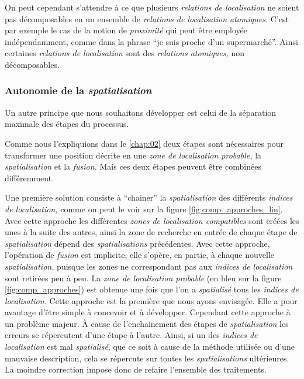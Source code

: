 On peut cependant s'attendre à ce que plusieurs \emph{relations de
  localisation} ne soient pas décomposables en un ensemble de
\emph{relations de localisation atomiques.} C'est par exemple le cas
de la notion de \emph{proximité} qui peut être employée
indépendamment, comme dans la phrase \enquote{je suis proche d'un
  supermarché}. Ainsi certaines \emph{relations de localisation} sont
des \emph{relations atomiques,} non décomposables.


\subsubsection{Autonomie de la \emph{spatialisation}}

Un autre principe que nous souhaitons développer est celui de la
séparation maximale des étapes du processus.

Comme nous l'expliquions dans le \autoref{chap:02} deux étapes sont
nécessaires pour transformer une position décrite en une \emph{zone de
  localisation probable,} la \emph{spatialisation} et la
\emph{fusion.} Mais ces deux étapes peuvent être combinées
différemment.

Une première solution consiste à \enquote{chainer} la
\emph{spatialisation} des différents \emph{indices de localisation,}
comme on peut le voir sur la figure \ref{fig:comp_approches_lin}. Avec
cette approche les différentes \emph{zones de localisation
  compatibles} sont créées les unes à la suite des autres, ainsi la
zone de recherche en entrée de chaque étape de \emph{spatialisation}
dépend des \emph{spatialisations} précédentes. Avec cette approche,
l'opération de \emph{fusion} est implicite, elle s'opère, en partie, à
chaque nouvelle \emph{spatialisation,} puisque les zones ne
correspondant pas aux \emph{indices de localisation} sont retirées peu
à peu. La \emph{zone de localisation probable} (en bleu sur la figure
\ref{fig:comp_approches}) est obtenue une fois que l'on a
\emph{spatialisé} tous les \emph{indices de localisation.} Cette
approche est la première que nous ayons envisagée. Elle a pour
avantage d'être simple à concevoir et à développer. Cependant cette
approche à un problème majeur. À cause de l'enchainement des étapes de
\emph{spatialisation} les erreurs se répercutent d'une étape à
l'autre. Ainsi, si un des \emph{indices de localisation} est mal
\emph{spatialisé}, que ce soit à cause de la méthode utilisée ou d'une
mauvaise description, cela se répercute sur toutes les
\emph{spatialisations} ultérieures. La moindre correction impose donc
de refaire l'ensemble des traitements.

